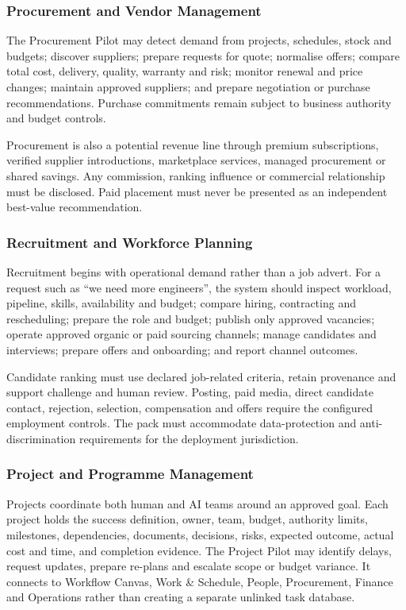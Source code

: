 \subsubsection{Procurement and Vendor Management}

The Procurement Pilot may detect demand from projects, schedules, stock and
budgets; discover suppliers; prepare requests for quote; normalise offers;
compare total cost, delivery, quality, warranty and risk; monitor renewal and
price changes; maintain approved suppliers; and prepare negotiation or purchase
recommendations.  Purchase commitments remain subject to business authority and
budget controls.

Procurement is also a potential revenue line through premium subscriptions,
verified supplier introductions, marketplace services, managed procurement or
shared savings.  Any commission, ranking influence or commercial relationship
must be disclosed.  Paid placement must never be presented as an independent
best-value recommendation.

\subsubsection{Recruitment and Workforce Planning}

Recruitment begins with operational demand rather than a job advert.  For a
request such as ``we need more engineers'', the system should inspect workload,
pipeline, skills, availability and budget; compare hiring, contracting and
rescheduling; prepare the role and budget; publish only approved vacancies;
operate approved organic or paid sourcing channels; manage candidates and
interviews; prepare offers and onboarding; and report channel outcomes.

Candidate ranking must use declared job-related criteria, retain provenance and
support challenge and human review.  Posting, paid media, direct candidate
contact, rejection, selection, compensation and offers require the configured
employment controls.  The pack must accommodate data-protection and
anti-discrimination requirements for the deployment jurisdiction.

\subsubsection{Project and Programme Management}

Projects coordinate both human and AI teams around an approved goal.  Each
project holds the success definition, owner, team, budget, authority limits,
milestones, dependencies, documents, decisions, risks, expected outcome, actual
cost and time, and completion evidence.  The Project Pilot may identify delays,
request updates, prepare re-plans and escalate scope or budget variance.  It
connects to Workflow Canvas, Work \& Schedule, People, Procurement, Finance and
Operations rather than creating a separate unlinked task database.

